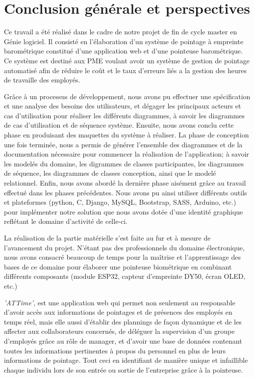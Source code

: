 \chapter*{Conclusion générale et perspectives}

Ce travail a été réalisé dans le cadre de notre projet de fin de cycle master en
Génie logiciel. Il consisté en l'élaboration d'un système de pointage à
empreinte barométrique constitué d'une application web et d'une pointeuse
barométrique. Ce système est destiné aux PME voulant avoir un système de gestion
de pointage automatisé afin de réduire le coût et le taux d'erreurs liés a la
gestion des heures de travaille des employés.

Grâce à un processus de développement, nous avons pu effectuer une spécification
et une analyse des besoins des utilisateurs, et dégager les principaux
acteurs et cas d'utilisation pour réaliser les différents diagrammes, à savoir
les diagrammes de cas d'utilisation et de séquence système. Ensuite, nous avons
conclu cette phase en produisant des maquettes du système à réaliser. La phase
de conception une fois terminée, nous a permis de générer l'ensemble des
diagrammes et de la documentation nécessaire pour commencer la réalisation de
l'application; à savoir les modelés du domaine,  les digrammes de classes
participantes, les diagrammes de séquence, les diagrammes de classes conception,
ainsi que le modelé relationnel. Enfin, nous avons abordé la dernière phase
aisément grâce au travail effectué dans les phases précédentes. Nous avons pu
ainsi utiliser différents outils et plateformes (python, C, Django, MySQL,
Bootstrap, SASS, Arduino, etc.) pour implémenter notre solution que nous avons
dotée d'une identité graphique reflétant le domaine d'activité de celle-ci.

La réalisation de la partie matérielle s'est faite au fur et à mesure de
l'avancement du projet. N’étant pas des professionnels du domaine électronique,
nous avons consacré beaucoup de temps pour la maîtrise et l'apprentissage des
bases de ce domaine pour élaborer une pointeuse biométrique en combinant
différents composants (module ESP32, capteur d'empreinte DY50, écran OLED, etc.)   

\emph{'ATTime'}, est une application web qui permet non seulement au responsable
d'avoir accès aux informations de pointages et de présences des employés en temps
réel, mais elle aussi d'établir des plannings de façon dynamique et de
les affecter aux collaborateurs concernés, de déléguer la supervision d'un
groupe d'employés grâce au rôle de manager, et d'avoir une base de données
contenant toutes les informations pertinentes à propos du personnel en plus de
leurs informations de pointage. Tout ceci en identifiant de manière
unique et infaillible chaque individu lors de son entrée ou sortie de
l'entreprise grâce à la pointeuse.   

